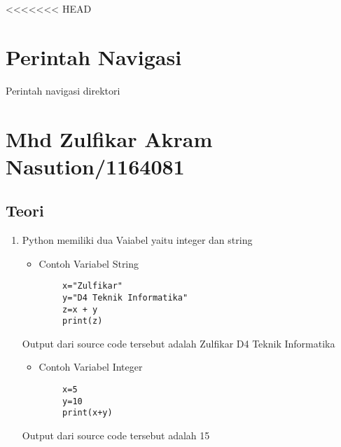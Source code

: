 <<<<<<< HEAD
\section{Perintah Navigasi}
Perintah navigasi direktori

\section{Mhd Zulfikar Akram Nasution/1164081}
\subsection{Teori}

\begin{enumerate}

\item Python memiliki dua Vaiabel yaitu integer dan string
	\begin{itemize}
	\item Contoh Variabel String
	\end{itemize}
	\begin{verbatim}
		x="Zulfikar"
		y="D4 Teknik Informatika"
		z=x + y
		print(z)
	\end{verbatim}
	\subitem Output dari source code tersebut adalah Zulfikar D4 Teknik Informatika
	\begin{itemize}	
	\item Contoh Variabel Integer
	\end{itemize}	
	\begin{verbatim}
		x=5
		y=10
		print(x+y)
	\end{verbatim}
	\subitem Output dari source code tersebut adalah 15


\end{enumerate}
